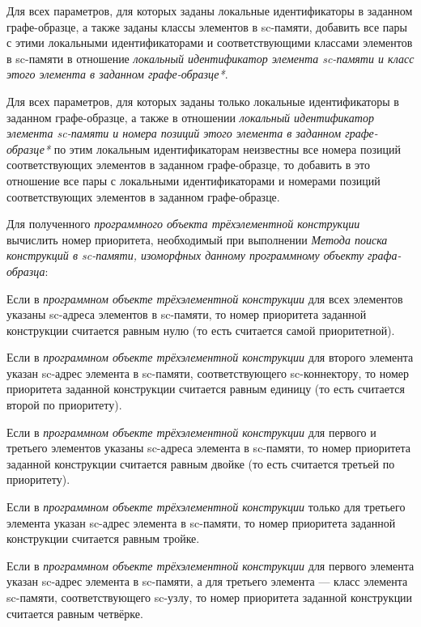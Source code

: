 \begin{textitemize}
	\item Для всех параметров, для которых заданы локальные идентификаторы в заданном графе-образце, а также заданы классы элементов в sc-памяти, добавить все пары с этими локальными идентификаторами и соответствующими классами элементов в sc-памяти в отношение \textit{локальный идентификатор элемента sc-памяти и класс этого элемента в заданном графе-образце*}.
	\item Для всех параметров, для которых заданы только локальные идентификаторы в заданном графе-образце, а также в отношении \textit{локальный идентификатор элемента sc-памяти и номера позиций этого элемента в заданном графе-образце*} по этим локальным идентификаторам неизвестны все номера позиций соответствующих элементов в заданном графе-образце, то добавить в это отношение все пары с локальными идентификаторами и номерами позиций соответствующих элементов в заданном графе-образце.
	\item Для полученного \textit{программного объекта трёхэлементной конструкции} вычислить номер приоритета, необходимый при выполнении \textit{Метода поиска конструкций в sc-памяти, изоморфных данному программному объекту графа-образца}:
	\begin{textitemize}
		\item Если в \textit{программном объекте трёхэлементной конструкции} для всех элементов указаны sc-адреса элементов в sc-памяти, то номер приоритета заданной конструкции считается равным нулю (то есть считается самой приоритетной).
		\item Если в \textit{программном объекте трёхэлементной конструкции} для второго элемента указан sc-адрес элемента в sc-памяти, соответствующего sc-коннектору, то номер приоритета заданной конструкции считается равным единицу (то есть считается второй по приоритету).
		\item Если в \textit{программном объекте трёхэлементной конструкции} для первого и третьего элементов указаны sc-адреса элемента в sc-памяти, то номер приоритета заданной конструкции считается равным двойке (то есть считается третьей по приоритету).
		\item Если в \textit{программном объекте трёхэлементной конструкции} только для третьего элемента указан sc-адрес элемента в sc-памяти, то номер приоритета заданной конструкции считается равным тройке.
		\item Если в \textit{программном объекте трёхэлементной конструкции} для первого элемента указан sc-адрес элемента в sc-памяти, а для третьего элемента --- класс элемента sc-памяти, соответствующего sc-узлу, то номер приоритета заданной конструкции считается равным четвёрке.

\end{textitemize}
\end{textitemize}
